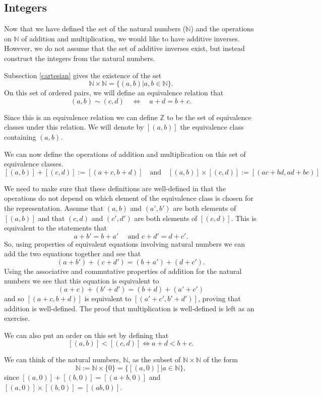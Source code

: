 \documentclass[
]{book}
\theoremstyle{definition}
\theoremstyle{definition}
\theoremstyle{definition}
\theoremstyle{definition}
\theoremstyle{remark}
\begin{document}
\hypertarget{integers}{%
\subsection{Integers}\label{integers}}

Now that we have defined the set of the natural numbers (\(\mathbb{N}\)) and the operations on \(\mathbb{N}\) of addition and multiplication, we would like to have additive inverses. However, we do not assume that the set of additive inverses exist, but instead construct the integers from the natural numbers.

Subsection \ref{cartesian} gives the existence of the set \[\mathbb{N}\times \mathbb{N} = \{ (a,b)  \vert a,b \in \mathbb{N}\}.\] On this set of ordered pairs, we will define an equivalence relation that
\[(a,b)\sim (c,d) \quad \Leftrightarrow \quad  a+d=b+c.\]

Since this is an equivalence relation we can define \(\mathbb{Z}\) to be the set of equivalence classes under this relation. We will denote by \([(a,b)]\) the equivalence class containing \((a,b)\).

We can now define the operations of addition and multiplication on this set of equivalence classes.
\[[(a,b)]+[(c,d)]:= [(a+c,b+d)] \quad \mbox{and} \quad [(a,b)]\times [(c,d)] := [(ac+bd,ad+bc)]\]

We need to make sure that these definitions are well-defined in that the operations do not depend on which element of the equivalence class is chosen for the representation. Assume that \((a,b)\) and \((a',b')\) are both elements of \([(a,b)]\) and that \((c,d)\) and \((c',d')\) are both elements of \([(c,d)]\). This is equivalent to the statements that \[a+b'=b+a' \quad \mbox{ and } c+d'=d+c'.\] So, using properties of equivalent equations involving natural numbers we can add the two equations together and see that \[(a+b') + (c+d') = (b+a')+(d+c').\] Using the associative and commutative properties of addition for the natural numbers we see that this equation is equivalent to \[(a+c) + (b'+d') = (b+d) + (a'+c')\] and so \([(a+c,b+d)]\) is equivalent to \([(a'+c',b'+d')]\), proving that addition is well-defined. The proof that multiplication is well-defined is left as an exercise.

We can also put an order on this set by defining that \[[(a,b)] < [(c,d)] \Leftrightarrow a+d<b+c.\]

We can think of the natural numbers, \(\mathbb{N}\), as the subset of \(\mathbb{N}\times \mathbb{N}\) of the form
\[\mathbb{N} := \mathbb{N} \times \{0\} = \{ [(a,0)] \vert a\in \mathbb{N}\},\] since \([(a,0)]+[(b,0)] = [(a+b,0)]\) and \([(a,0)] \times [(b,0)] = [(ab,0)]\).
\end{document}
